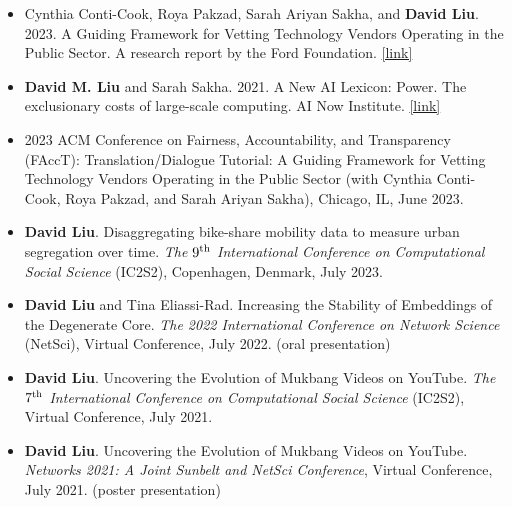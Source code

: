 \documentclass[margin]{res}
\begin{document}
\begin{resume}
\begin{itemize}
\section{Public\\Scholarship}
\setlength{\itemsep}{14pt}
\setlength{\parsep}{0pt}
\item[]
Cynthia Conti-Cook, Roya Pakzad, Sarah Ariyan Sakha, and \textbf{David Liu}. 2023. A Guiding Framework for Vetting Technology Vendors Operating in the Public Sector. A research report by the Ford Foundation. \href{https://www.fordfoundation.org/work/learning/research-reports/a-guiding-framework-to-vetting-public-sector-technology-vendors/}{[link]}
\item[]
\textbf{David M. Liu} and Sarah Sakha. 2021. A New AI Lexicon: Power. The exclusionary costs of large-scale computing. AI Now Institute. \href{https://ainowinstitute.org/publications/collection/a-new-ai-lexicon-power}{[link]}
\end{itemize}

\begin{itemize}
\section{Tutorials}
\item[]
2023 ACM Conference on Fairness, Accountability, and Transparency (FAccT): Translation/Dialogue Tutorial: A Guiding Framework for Vetting Technology Vendors Operating in the Public Sector (with Cynthia Conti-Cook, Roya Pakzad, and Sarah Ariyan Sakha), Chicago, IL, June 2023.
\end{itemize}

\begin{itemize}
\section{Posters}
\setlength{\itemsep}{14pt}
\setlength{\parsep}{0pt}
\item[]
\textbf{David Liu}. Disaggregating bike-share mobility data to measure urban segregation over time. \textit{The $9\textsuperscript{th}$ International Conference on Computational Social Science} (IC2S2), Copenhagen, Denmark, July 2023.
\item[]
\textbf{David Liu} and Tina Eliassi-Rad. Increasing the Stability of Embeddings of the Degenerate Core. \textit{The 2022 International Conference on Network Science} (NetSci), Virtual Conference, July 2022. (oral presentation)
\item[]
\textbf{David Liu}. Uncovering the Evolution of Mukbang Videos on YouTube. \textit{The $7\textsuperscript{th}$ International Conference on Computational Social Science} (IC2S2), Virtual Conference, July 2021.
\item[]
\textbf{David Liu}. Uncovering the Evolution of Mukbang Videos on YouTube. \textit{Networks 2021: A Joint Sunbelt and NetSci Conference}, Virtual Conference, July 2021. (poster presentation)
\end{itemize}



\end{resume}
\end{document}
